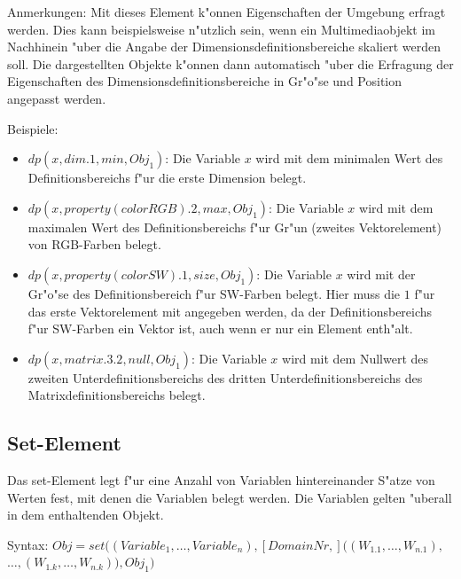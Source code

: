 \bigskip\noindent
Anmerkungen:
Mit dieses Element k"onnen Eigenschaften der Umgebung erfragt werden.
Dies kann beispielsweise n"utzlich sein, wenn ein Multimediaobjekt im Nachhinein "uber die Angabe der Dimensionsdefinitionsbereiche skaliert werden soll. Die dargestellten Objekte k"onnen dann automatisch "uber die Erfragung der Eigenschaften des Dimensionsdefinitionsbereiche in Gr"o"se und Position angepasst werden.

\bigskip\noindent
Beispiele:
\begin{itemize}
 \item $dp( x , dim.1, min, Obj_1 )$: Die Variable $x$ wird mit dem minimalen Wert des Definitionsbereichs f"ur die erste Dimension belegt.
 \item $dp( x , property( colorRGB).2, max, Obj_1 )$: Die Variable $x$ wird mit dem maximalen Wert des Definitionsbereichs f"ur Gr"un (zweites Vektorelement) von RGB-Farben belegt.
 \item $dp( x , property( colorSW).1, size, Obj_1 )$: Die Variable $x$ wird mit der Gr"o"se des Definitionsbereich f"ur SW-Farben belegt. Hier muss die $1$ f"ur das erste Vektorelement mit angegeben werden, da der Definitionsbereichs f"ur SW-Farben ein Vektor ist, auch wenn er nur ein Element enth"alt.
 \item $dp( x , matrix.3.2, null, Obj_1 )$: Die Variable $x$ wird mit dem Nullwert des zweiten Unterdefinitionsbereichs des dritten Unterdefinitionsbereichs des Matrixdefinitionsbereichs belegt.
\end{itemize}



\subsection{Set-Element}
\label{secFibSetElement}

\bigskip\noindent
Das set-Element legt f"ur eine Anzahl von Variablen hintereinander S"atze von Werten fest, mit denen die Variablen belegt werden. Die Variablen gelten "uberall in dem enthaltenden Objekt.

\bigskip\noindent
Syntax:
$Obj = set( (Variable_1, \ldots, Variable_n), [DomainNr,]( (W_{1.1}, \ldots, W_{n.1}),$\\ $ \ldots, (W_{1.k}, \ldots, W_{n.k}) ), Obj_1)$

